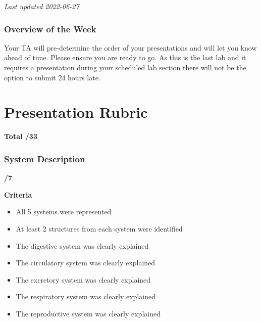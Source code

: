 \documentclass[
]{book}
\providecommand{\tightlist}{%
  \setlength{\itemsep}{0pt}\setlength{\parskip}{0pt}}
\begin{document}
\emph{Last updated 2022-06-27}

\hypertarget{overview-of-the-week-4}{%
\subsection*{Overview of the Week}\label{overview-of-the-week-4}}

Your TA will pre-determine the order of your presentations and will let you know ahead of time. Please ensure you are ready to go. As this is the last lab and it requires a presentation during your scheduled lab section there will not be the option to submit 24 hours late.

\hypertarget{presentation-rubric}{%
\chapter*{Presentation Rubric}\label{presentation-rubric}}

\textbf{Total /33}

\hypertarget{system-description}{%
\subsection*{System Description}\label{system-description}}

\textbf{/7}

\textbf{Criteria}

\begin{itemize}
\tightlist
\item
  All 5 systems were represented
\item
  At least 2 structures from each system were identified
\item
  The digestive system was clearly explained
\item
  The circulatory system was clearly explained
\item
  The excretory system was clearly explained
\item
  The respiratory system was clearly explained
\item
  The reproductive system was clearly explained
\end{itemize}
\end{document}
